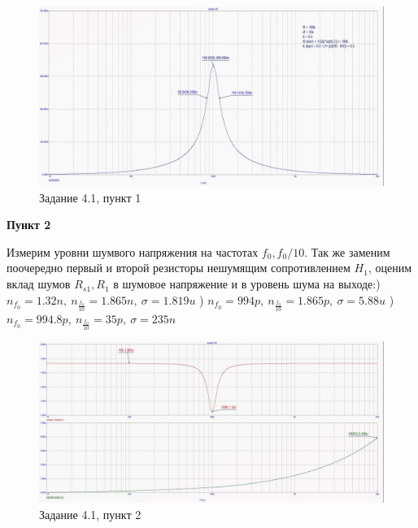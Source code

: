 \documentclass[a4paper, 14pt]{extarticle}%
\begin{document}
\begin{figure}[h!]
			\centering
			\includegraphics[width=1.1\linewidth]{4/4_1_2.jpg}
			\caption{Задание 4.1, пункт 1}
			\label{A}
\end{figure}


\textbf{Пункт 2}
\newline

Измерим уровни шумвого напряжения на частотах $f_0, f_0/10$. Так же заменим поочередно первый и второй резисторы нешумящим сопротивлением $H_1$, оценим вклад шумов $R_{s1}, R_1$ в шумовое напряжение и в уровень шума на выходе:) $n_{f_0} = 1.32n, \: n_{\frac{f_0}{10}} = 1.865n, \: \sigma = 1.819u$
) $n_{f_0} = 994p, \: n_{\frac{f_0}{10}} = 1.865p, \: \sigma = 5.88u$
) $n_{f_0} = 994.8p, \: n_{\frac{f_0}{10}} = 35p, \: \sigma = 235n$

\begin{figure}[h!]
			\centering
			\includegraphics[width=1.1\linewidth]{4/4_1_3.jpg}
			\caption{Задание 4.1, пункт 2}
			\label{A}
\end{figure}
\end{document}
